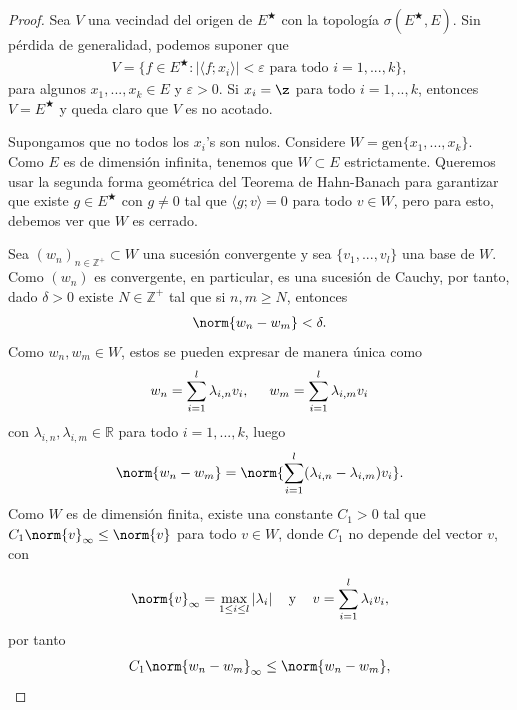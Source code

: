 \begin{proof}
    Sea $V$ una vecindad del origen de $E^\bigstar$ con la topología $\sigma(E^\bigstar,E)$. Sin pérdida de generalidad, podemos suponer que
    \begin{align*}
        V=\{f \in E^\bigstar:|\langle f;x_i\rangle|<\varepsilon \text{ para todo } i=1,...,k\},
    \end{align*}
    para algunos $x_1,...,x_k\in E$ y $\varepsilon>0$. Si $x_i=\z$ para todo $i=1,..,k$, entonces $V=E^\bigstar$ y queda claro que $V$ es no acotado.
    
    Supongamos que no todos los $x_i$'s son nulos. Considere $W=\text{gen}\{x_1,...,x_k\}$. Como $E$ es de dimensión infinita, tenemos que $W\subset E$ estrictamente. Queremos usar la segunda forma geométrica del Teorema de Hahn-Banach para garantizar que existe $g\in E^\bigstar$ con $g\neq 0$ tal que $\langle g;v\rangle=0$ para todo $v \in W$, pero para esto, debemos ver que $W$ es cerrado.
    
    Sea $(w_n)_{n \in \mathbb{Z}^+}\subset W$ una sucesión convergente y sea $\{v_1,...,v_l\}$ una base de $W$. Como $(w_n)$ es convergente, en particular, es una sucesión de Cauchy, por tanto, dado $\delta>0$ existe $N\in \mathbb{Z}^+$ tal que si $n,m\geq N$, entonces
    \begin{align*}
        \norm{w_n-w_m}<\delta.
    \end{align*}
    Como $w_n,w_m\in W$, estos se pueden expresar de manera única como
    \begin{align*}
        w_n=\sum_{i=1}^l \lambda_{i,n} v_i, \hspace{5mm} w_m=\sum_{i=1}^l \lambda_{i,m}v_i 
    \end{align*}
    con $\lambda_{i,n},\lambda_{i,m}\in \mathbb{R}$ para todo $i=1,...,k$, luego
    \begin{align*}
        \norm{w_n-w_m}=\norm{\sum_{i=1}^l(\lambda_{i,n}-\lambda_{i,m})v_i}.
    \end{align*}
    Como $W$ es de dimensión finita, existe una constante $C_1>0$ tal que $C_1\norm{v}_\infty\leq \norm{v}$ para todo $v \in W$, donde $C_1$ no depende del vector $v$, con 

    \begin{align*}
        \norm{v}_\infty=\max_{1\leq i\leq l} |\lambda_i| \hspace{3mm} \text{ y } \hspace{3mm} v=\sum_{i=1}^l \lambda_i v_i,
    \end{align*}
    por tanto
    \begin{align*}
        C_1\norm{w_n-w_m}_\infty\leq \norm{w_n-w_m},
    \end{align*}
    

\end{proof}
